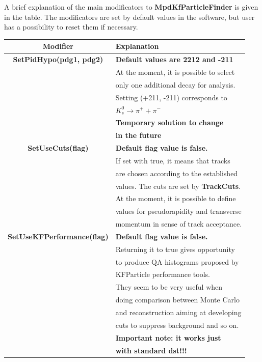 \documentclass[8pt,a5paper, oldfontcommands]{memoir}
\begin{document}
A brief explanation of the main modificators to {\bf MpdKfParticleFinder} is given in the table. The modificators are set by default values in the software, but user has a possibility
to reset them if necessary.
 \begin{table}[H]
         \begin{tabular}{|c|l|} 
           \hline
           Modifier & Explanation \\
           \hline
           \bf SetPidHypo(pdg1, pdg2) & {\color{blue} \bf Default values are 2212 and -211}\\
           & At the moment, it is possible to select \\
           & only one additional decay for analysis. \\
           & Setting (+211, -211) corresponds to \\
           & $K_{s}^{0} \rightarrow \pi^{+} + \pi^{-}$ \\
           & \color{red} \bf Temporary solution to change \\
           & \color{red} \bf in the future \\
           \hline
           \bf SetUseCuts(flag) & {\color{blue} \bf Default flag value is false.} \\
           & If set with true, it means that tracks \\
           & are chosen according to the established \\
           & values. The cuts are set by {\bf TrackCuts}. \\
           & At the moment, it is possible to define \\
           & values for pseudorapidity and transverse \\
           & momentum in sense of track acceptance.\\
           \hline
           \bf SetUseKFPerformance(flag) & {\color{blue} \bf Default flag value is false.} \\
           & Returning it to true gives opportunity \\
           & to produce QA histograms proposed by \\
           & KFParticle performance tools. \\ 
           & They seem to be very useful when \\
           & doing comparison between Monte Carlo \\
           & and reconstruction aiming at developing \\
           & cuts to suppress background and so on. \\
           & {\color{red} \bf Important note: it works just} \\
           & {\color{red} \bf with standard dst!!!} \\
           \hline
         \end{tabular}
 \end{table}
\end{document}
